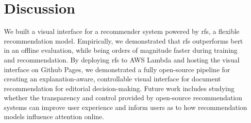 \section{Discussion}
We built a visual interface for a recommender system powered by \gls{rfs}, a flexible recommendation model. Empirically, we demonstrated that \gls{rfs} outperforms \acrshort{bert} in an offline evaluation, while being orders of magnitude faster during training and recommendation. By deploying \gls{rfs} to AWS Lambda and hosting the visual interface on Github Pages, we demonstrated a fully open-source pipeline for creating an explanation-aware, controllable visual interface for document recommendation for editorial decision-making. Future work includes studying whether the transparency and control provided by open-source recommendation systems can improve user experience and inform users as to how recommendation models influence attention online.